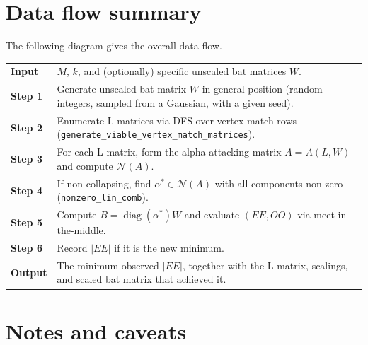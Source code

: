 \documentclass[12pt,a4paper]{article}
\begin{document}
\section{Data flow summary}

The following diagram gives the overall data flow.

\medskip
\noindent
\begin{tabular}{l p{9cm}}
  \textbf{Input} & $M$, $k$, and (optionally) specific unscaled bat matrices $W$. \\[4pt]
  \textbf{Step 1} & Generate unscaled bat matrix $W$ in general position (random
    integers, sampled from a Gaussian, with a given seed). \\[4pt]
  \textbf{Step 2} & Enumerate L-matrices via DFS over vertex-match rows
    (\texttt{generate\_viable\_vertex\_match\_matrices}). \\[4pt]
  \textbf{Step 3} & For each L-matrix, form the alpha-attacking matrix $A =
    A(L, W)$ and compute $\mathcal{N}(A)$. \\[4pt]
  \textbf{Step 4} & If non-collapsing, find $\alpha^* \in \mathcal{N}(A)$ with
    all components non-zero (\texttt{nonzero\_lin\_comb}). \\[4pt]
  \textbf{Step 5} & Compute $B = \operatorname{diag}(\alpha^*) W$ and evaluate
    $(EE, OO)$ via meet-in-the-middle. \\[4pt]
  \textbf{Step 6} & Record $|EE|$ if it is the new minimum. \\[4pt]
  \textbf{Output} & The minimum observed $|EE|$, together with the L-matrix,
    scalings, and scaled bat matrix that achieved it.
\end{tabular}

\section{Notes and caveats}
\end{document}
